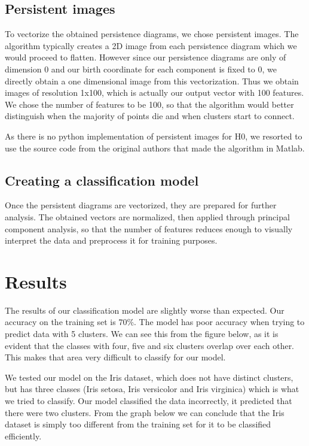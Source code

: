 \documentclass{article}
\begin{document}
\subsection{Persistent images}
To vectorize the obtained persistence diagrams, we chose persistent images. The algorithm typically creates a 2D image from each persistence diagram which we would proceed to flatten. However since our persistence diagrams are only of dimension 0 and our birth coordinate for each component is fixed to 0, we directly obtain a one dimensional image from this vectorization. Thus we obtain images of resolution 1x100, which is actually our output vector with 100 features. We chose the number of features to be 100, so that the algorithm would better distinguish when the majority of points die and when clusters start to connect.\par
As there is no python implementation of persistent images for H0, we resorted to use the source code from the original authors that made the algorithm in Matlab. %


\subsection{Creating a classification model}
Once the persistent diagrams are vectorized, they are prepared for further analysis. The obtained vectors are normalized, then applied through principal component analysis, so that the number of features reduces enough to visually interpret the data and preprocess it for training purposes.\par



\section{Results}
The results of our classification model are slightly worse than expected. Our accuracy on the training set is $70\%$. The model has poor accuracy when trying to predict data with 5 clusters. We can see this from the figure below, as it is evident that the classes with four, five and six clusters overlap over each other. This makes that area very difficult to classify for our model.\par
We tested our model on the Iris dataset, which does not have distinct clusters, but has three classes (Iris setosa, Iris versicolor and Iris virginica) which is what we tried to classify. Our model classified the data incorrectly, it predicted that there were two clusters. From the graph below we can conclude that the Iris dataset is simply too different from the training set for it to be classified efficiently.\par
\end{document}

